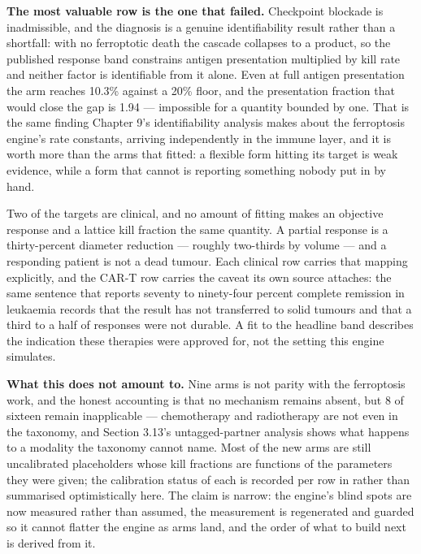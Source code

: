 \documentclass[11pt,twoside,openright]{report}
\begin{document}
\textbf{The most valuable row is the one that failed.} Checkpoint blockade is inadmissible, and the diagnosis is a genuine identifiability result rather than a shortfall: with no ferroptotic death the cascade collapses to a product, so the published response band constrains antigen presentation multiplied by kill rate and neither factor is identifiable from it alone. Even at full antigen presentation the arm reaches 10.3\% against a 20\% floor, and the presentation fraction that would close the gap is 1.94 --- impossible for a quantity bounded by one. That is the same finding Chapter 9's identifiability analysis makes about the ferroptosis engine's rate constants, arriving independently in the immune layer, and it is worth more than the arms that fitted: a flexible form hitting its target is weak evidence, while a form that cannot is reporting something nobody put in by hand.

Two of the targets are clinical, and no amount of fitting makes an objective response and a lattice kill fraction the same quantity. A partial response is a thirty-percent diameter reduction --- roughly two-thirds by volume --- and a responding patient is not a dead tumour. Each clinical row carries that mapping explicitly, and the CAR-T row carries the caveat its own source attaches: the same sentence that reports seventy to ninety-four percent complete remission in leukaemia records that the result has not transferred to solid tumours and that a third to a half of responses were not durable. A fit to the headline band describes the indication these therapies were approved for, not the setting this engine simulates.

\textbf{What this does not amount to.} Nine arms is not parity with the ferroptosis work, and the honest accounting is that no mechanism remains absent, but 8 of sixteen remain inapplicable --- chemotherapy and radiotherapy are not even in the taxonomy, and Section 3.13's untagged-partner analysis shows what happens to a modality the taxonomy cannot name. Most of the new arms are still uncalibrated placeholders whose kill fractions are functions of the parameters they were given; the calibration status of each is recorded per row in  rather than summarised optimistically here. The claim is narrow: the engine's blind spots are now measured rather than assumed, the measurement is regenerated and guarded so it cannot flatter the engine as arms land, and the order of what to build next is derived from it.
\end{document}
